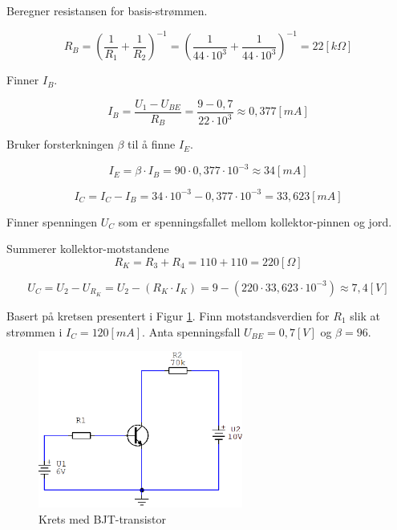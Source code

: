 \vspace{0.5cm} %

\begin{solution}[name=Løsningsforslag oppgave]
Beregner resistansen for basis-strømmen.

\[R_B= \left(\frac{1}{R_1} + \frac{1}{R_2} \right)^{-1} = \left( \frac{1}{44\cdot 10^3} + \frac{1}{44 \cdot 10^3}\right)^{-1}= 22 [k\Omega]\]

Finner $I_B$.

\[I_B = \frac{U_1-U_{BE}}{R_B} = \frac{9-0,7}{22 \cdot 10^3} \approx 0,377 [mA]\]

Bruker forsterkningen $\beta$ til å finne $I_E$.

\[I_E = \beta \cdot I_B = 90 \cdot 0,377 \cdot 10^{-3} \approx 34 [mA] \]

\[I_C = I_C - I_B = 34 \cdot 10^{-3} - 0,377 \cdot 10^{-3} = 33,623 [mA]\]

Finner spenningen $U_C$ som er spenningsfallet mellom kollektor-pinnen og jord.

Summerer kollektor-motstandene
\[R_K = R_3+R_4=110+110=220 [\Omega]\]

\[U_C=U_2-U_{R_{K}} = U_2 - \left( R_K \cdot I_K \right)=9- \left( 220 \cdot 33,623 \cdot 10^{-3} \right) \approx 7,4 [V]\]

\end{solution}

\vspace{0.5cm} %

\begin{question}[name=Oppgave, topic=transBJT]
	Basert på kretsen presentert i Figur \ref{fig:tranBJT5}. Finn motstandsverdien for $R_1$ slik at strømmen i $I_C=120 [mA]$. Anta spenningsfall $U_{BE}=0,7[V]$ og $\beta=96$.

	\begin{figure}[H]
		\centering
		\includegraphics[width=0.6\textwidth]{transistor-BJT/figurer/krets5.png}
		\caption{Krets med BJT-transistor}
		\label{fig:tranBJT5}
	\end{figure}

\end{question}

